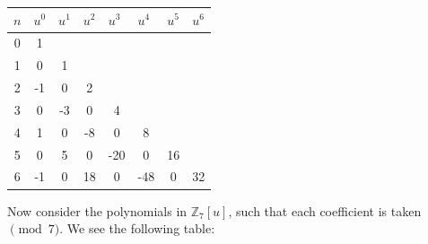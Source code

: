\documentclass[12pt, letterpaper]{article} %
\begin{document}
\begin{center}
  \begin{tabular}{|c|c|c|c|c|c|c|c|}
   \hline
   \multicolumn{1}{|l|}{$n$} & \multicolumn{1}{l|}{$u^0$} & \multicolumn{1}{l|}{$u^1$} & \multicolumn{1}{l|}{$u^2$} & \multicolumn{1}{l|}{$u^3$} & \multicolumn{1}{l|}{$u^4$} & \multicolumn{1}{l|}{$u^5$} & \multicolumn{1}{l|}{$u^6$} \\ \hline
   0                         & 1                          &                            &                            &                            &                            &                            &                            \\ \hline
   1                         & 0                          & 1                          &                            &                            &                            &                            &                            \\ \hline
   2                         & -1                         & 0                          & 2                          &                            &                            &                            &                            \\ \hline
   3                         & 0                          & -3                         & 0                          & 4                          &                            &                            &                            \\ \hline
   4                         & 1                          & 0                          & -8                         & 0                          & 8                          &                            &                            \\ \hline
   5                         & 0                          & 5                          & 0                          & -20                        & 0                          & 16                         &                            \\ \hline
   6                         & -1                         & 0                          & 18                         & 0                          & -48                        & 0                          & 32                         \\ \hline
  \end{tabular}
  \end{center}
Now consider the polynomials in $\mathbb{Z}_7[u]$, such that each coefficient is taken $\pmod{7}$. We see the following table:
\end{document}

